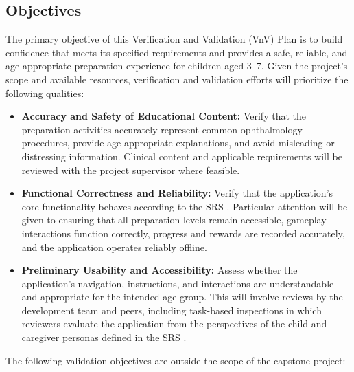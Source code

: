 \documentclass[10pt,titlepage]{article}
\begin{document}
\subsection{Objectives}\label{sec:Objectives}

The primary objective of this Verification and Validation (VnV) Plan
is to build confidence that \progname{} meets its specified requirements
and provides a safe, reliable, and age-appropriate preparation
experience for children aged 3--7. Given the project's scope and
available resources, verification and validation efforts will
prioritize the following qualities:

\begin{itemize}
    \item \textbf{Accuracy and Safety of Educational Content:}
    Verify that the preparation activities accurately represent
    common ophthalmology procedures, provide age-appropriate
    explanations, and avoid misleading or distressing information.
    Clinical content and applicable requirements will be reviewed
    with the project supervisor where feasible.

    \item \textbf{Functional Correctness and Reliability:}
    Verify that the application's core functionality behaves
    according to the SRS \cite{SRS}. Particular attention will be given to
    ensuring that all preparation levels remain accessible,
    gameplay interactions function correctly, progress and
    rewards are recorded accurately, and the application operates
    reliably offline.

    \item \textbf{Preliminary Usability and Accessibility:}
    Assess whether the application's navigation, instructions,
    and interactions are understandable and appropriate for
    the intended age group. This will involve reviews by the
    development team and peers, including task-based inspections
    in which reviewers evaluate the application from the
    perspectives of the child and caregiver personas defined
    in the SRS \cite{SRS}.
\end{itemize}

The following validation objectives are outside the scope of the
capstone project:
\end{document}

